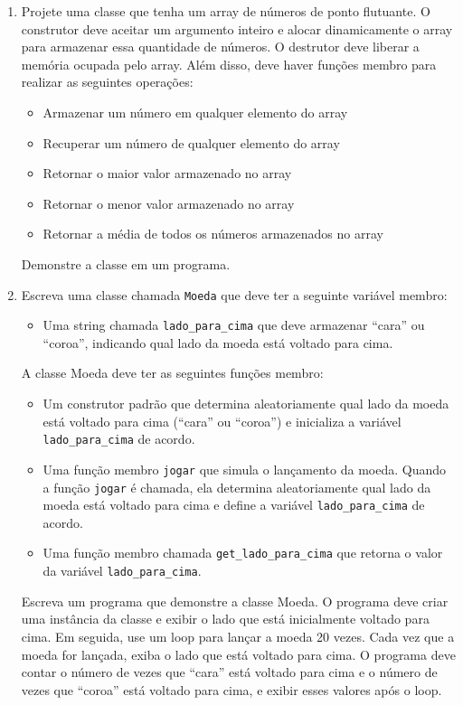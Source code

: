 \documentclass[12pt]{article}
\begin{document}
\begin{enumerate}
  \item Projete uma classe que tenha um array de números de ponto flutuante. O construtor deve aceitar um argumento inteiro e alocar dinamicamente o array para armazenar essa quantidade de números. O destrutor deve liberar a memória ocupada pelo array. Além disso, deve haver funções membro para realizar as seguintes operações:
    \begin{itemize}
      \item Armazenar um número em qualquer elemento do array
      \item Recuperar um número de qualquer elemento do array
      \item Retornar o maior valor armazenado no array
      \item Retornar o menor valor armazenado no array
      \item Retornar a média de todos os números armazenados no array
    \end{itemize}
    Demonstre a classe em um programa.

  \item Escreva uma classe chamada \texttt{Moeda} que deve ter a seguinte variável membro:
    \begin{itemize}
      \item Uma string chamada \texttt{lado\_para\_cima} que deve armazenar ``cara'' ou ``coroa'', indicando qual lado da moeda está voltado para cima.
    \end{itemize}
    A classe Moeda deve ter as seguintes funções membro:
    \begin{itemize}
      \item Um construtor padrão que determina aleatoriamente qual lado da moeda está voltado para cima (``cara'' ou ``coroa'') e inicializa a variável \texttt{lado\_para\_cima} de acordo.
      \item Uma função membro \texttt{jogar} que simula o lançamento da moeda. Quando a função \texttt{jogar} é chamada, ela determina aleatoriamente qual lado da moeda está voltado para cima e define a variável \texttt{lado\_para\_cima} de acordo.
      \item Uma função membro chamada \texttt{get\_lado\_para\_cima} que retorna o valor da variável \texttt{lado\_para\_cima}.
    \end{itemize}
    Escreva um programa que demonstre a classe Moeda. O programa deve criar uma instância da classe e exibir o lado que está inicialmente voltado para cima. Em seguida, use um loop para lançar a moeda 20 vezes. Cada vez que a moeda for lançada, exiba o lado que está voltado para cima. O programa deve contar o número de vezes que ``cara'' está voltado para cima e o número de vezes que ``coroa'' está voltado para cima, e exibir esses valores após o loop.

\end{enumerate}
\end{document}
